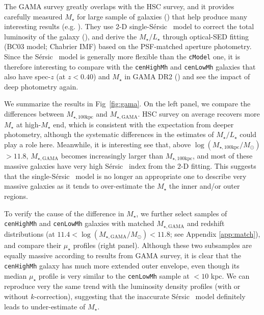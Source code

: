 \documentclass[a4paper,fleqn,usenatbib]{mnras}
\def\ser{{S\'{e}rsic\ }}
\def\rbcg{\texttt{cenHighMh}}
\def\nbcg{\texttt{cenLowMh}}
\def\mstar{{$M_{\star}$}}
\def\mtot{{$M_{\star,100\mathrm{kpc}}$}}
\def\mgama{{$M_{\star,\mathrm{GAMA}}$}}
\def\logmtot{{$\log (M_{\star,100\mathrm{kpc}}/M_{\odot})$}}
\def\logmgama{{$\log (M_{\star,\mathrm{GAMA}}/M_{\odot})$}}
\def\m2l{{$M_{\star}/L_{\star}$}}
\def\mden{{$\mu_{\star}$}}
\begin{document}
    The GAMA survey greatly overlaps with the HSC survey, and it provides carefully 
    measured \mstar{} for large sample of galaxies (\citealt{Taylor2011}) that help 
    produce many interesting results (e.g. \citealt{Bauer2013, Ferreras2017}).
    They use 2-D single-\ser{} model to correct the total luminosity of the galaxy 
    (\citealt{Kelvin2012}), and derive the \m2l{} through optical-SED fitting 
    (BC03 model; Chabrier IMF) based on the PSF-matched aperture photometry. 
    Since the \ser{} model is generally more flexible than the \texttt{cModel} one, 
    it is therefore interesting to compare with the \rbcg{} and \nbcg{} galaxies 
    that also have spec-$z$ (at $z < 0.40$) and \mstar{} in GAMA DR2 
    (\citealt{Liske2015}) and see the impact of deep photometry again. 
    
    We summarize the results in Fig~\ref{fig:gama}.  
    On the left panel, we compare the differences between \mtot{} and \mgama{}. 
    HSC survey on average recovers more \mstar{} at high-\mstar{} end, which is 
    consistent with the expectation from deeper photometry, although the 
    systematic differences in the estimates of \m2l{} could play a role here. 
    Meanwhile, it is interesting see that, above \logmtot{}$> 11.8$, \mgama{} 
    becomes increasingly larger than \mtot{}, and most of these massive 
    galaxies have very high \ser{} index from the 2-D fitting. 
    This suggests that the single-\ser{} model is no longer an appropriate one to 
    describe very massive galaxies as it tends to over-estimate the \mstar{} the 
    inner and/or outer regions. 
    
    To verify the cause of the difference in \mstar{}, we further select samples 
    of \rbcg{} and \nbcg{} galaxies with matched \mgama{} and redshift 
    distributions (at $11.4 <$\logmgama{}$<11.8$; see Appendix \ref{app:match}), 
    and compare their \mden{} profiles (right panel). 
    Although these two subsamples are equally massive according to results from 
    GAMA survey, it is clear that the \rbcg{} galaxy has much more extended 
    outer envelope, even though its median \mden{} profile is very similar 
    to the \nbcg{} sample at $< 10$ kpc. 
    We can reproduce very the same trend with the luminosity density profiles 
    (with or without $k$-correction), suggesting that the inaccurate \ser{} 
    model definitely leads to under-estimate of \mstar{}.  
 


\bsp
\label{lastpage}
\end{document}
